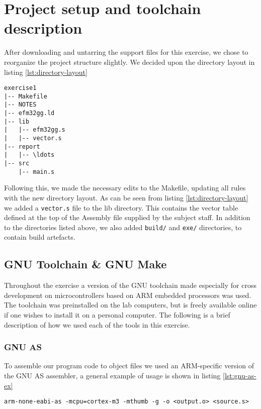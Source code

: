 \section{Project setup and toolchain description}

After downloading and untarring the support files for this exercise, we chose to reorganize the project structure slightly. We decided upon the directory layout in listing \ref{lst:directory-layout}

\begin{lstlisting}[label=lst:directory-layout,caption=Directory layout]
exercise1
|-- Makefile
|-- NOTES
|-- efm32gg.ld
|-- lib
|   |-- efm32gg.s
|   |-- vector.s
|-- report
|   |-- \ldots
|-- src
    |-- main.s
\end{lstlisting}

Following this, we made the necessary edits to the Makefile, updating all rules with the new directory layout. As can be seen from listing \ref{lst:directory-layout} we added a \texttt{vector.s} file to the lib directory. This contains the vector table defined at the top of the Assembly file supplied by the subject staff. In addition to the directories listed above, we also added \texttt{build/} and \texttt{exe/} directories, to contain build artefacts.

\subsection{GNU Toolchain \& GNU Make}

Throughout the exercise a version of the GNU toolchain made especially for cross development on microcontrollers based on ARM embedded processors was used. The toolchain was preinstalled on the lab computers, but is freely available online if one wishes to install it on a personal computer. The following is a brief description of how we used each of the tools in this exercise.

\subsubsection{GNU AS}

To assemble our program code to object files we used an ARM-specific version of the GNU AS assembler, a general example of usage is shown in listing \ref{lst:gnu-as-ex}

\begin{lstlisting}[label=lst:gnu-as-ex,caption=Assembler usage]
arm-none-eabi-as -mcpu=cortex-m3 -mthumb -g -o <output.o> <source.s>
\end{lstlisting}


